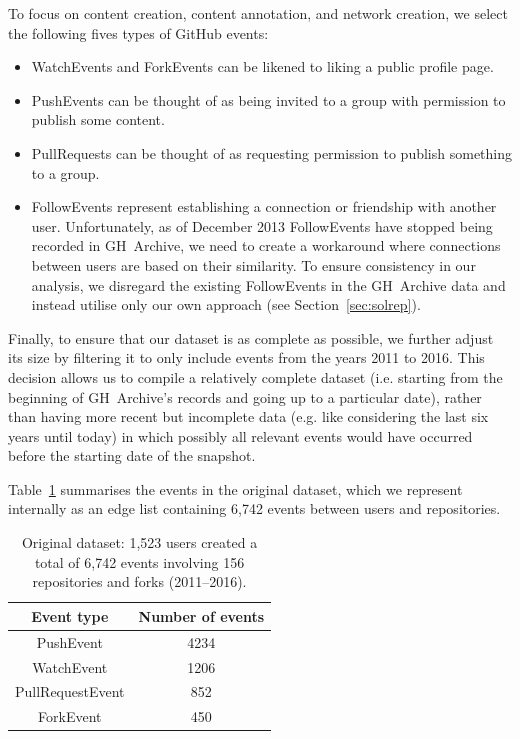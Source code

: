 \documentclass[dvipsnames,format=sigconf,anonymous=False,review=false, balance=false]{acmart}
\begin{document}
To focus on content creation, content annotation, and network creation, we select the following fives types of GitHub events:
\begin{itemize}
\item WatchEvents and ForkEvents can be likened to liking a public profile page.
\item PushEvents can be thought of as being invited to a group with permission to publish some content.
\item PullRequests can be thought of as requesting permission to publish something to a group.
\item FollowEvents represent establishing a connection or friendship with another user. Unfortunately, as of December 2013 FollowEvents have stopped being recorded in GH~Archive, we need to create a workaround where connections between users are based on their similarity. To ensure consistency in our analysis, we disregard the existing FollowEvents in the GH~Archive data and instead utilise only our own approach (see Section~\ref{sec:solrep}).
\end{itemize}

Finally, to ensure that our dataset is as complete as possible, we further adjust its size by filtering it to only include events from the years 2011 to 2016. This decision allows us to compile a relatively complete dataset (i.e. starting from the beginning of GH~Archive's records and going up to a particular date), rather than having more recent but incomplete data (e.g. like considering the last six years until today) in which possibly all relevant events would have occurred before the starting date of the snapshot. 

Table~\ref{tab:original} summarises the events in the original dataset, which we represent internally as an edge list containing 6,742 events between users and repositories.

\begin{table}
\centering
\caption{Original dataset: 1,523 users created a total of 6,742 events involving 156 repositories and forks (2011--2016).}
\label{tab:original}\vspace{-1mm}
\begin{tabular}{cc}
  \toprule
  \textbf{Event type} & \textbf{Number of events} \\
  \midrule
  PushEvent & 4234 \\
  WatchEvent & 1206 \\
  PullRequestEvent & 852 \\
  ForkEvent & 450 \\
  \bottomrule
\end{tabular}
\end{table}
\end{document}
